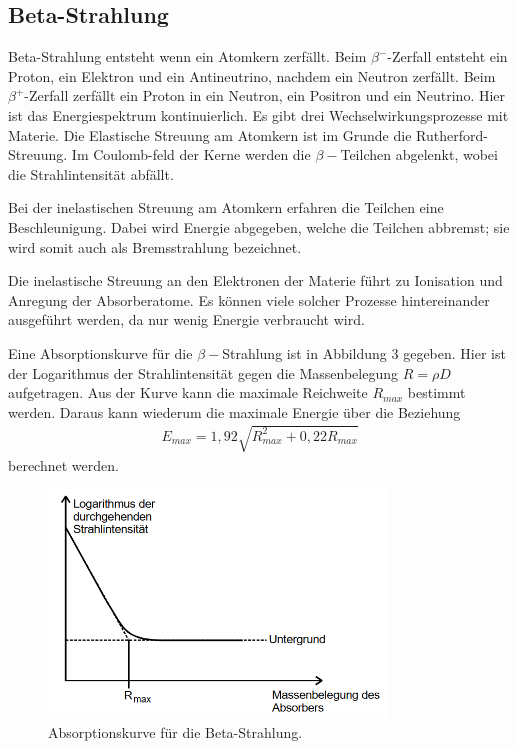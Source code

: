 \subsection{Beta-Strahlung}
Beta-Strahlung entsteht wenn ein Atomkern zerfällt. Beim $\beta^{-}$-Zerfall entsteht ein Proton, ein Elektron und ein Antineutrino, nachdem ein Neutron zerfällt.
Beim $\beta^{+}$-Zerfall zerfällt ein Proton in ein Neutron, ein Positron und ein Neutrino. 
Hier ist das Energiespektrum kontinuierlich.
Es gibt drei Wechselwirkungsprozesse mit Materie.
Die Elastische Streuung am Atomkern ist im Grunde die Rutherford-Streuung. Im Coulomb-feld der Kerne werden die $\beta-$Teilchen abgelenkt, wobei die Strahlintensität abfällt.

\noindent Bei der inelastischen Streuung am Atomkern erfahren die Teilchen eine Beschleunigung. Dabei wird Energie abgegeben, welche die Teilchen abbremst; sie wird somit auch als Bremsstrahlung bezeichnet.

\noindent Die inelastische Streuung an den Elektronen der Materie führt zu Ionisation und Anregung der Absorberatome. Es können viele solcher Prozesse hintereinander ausgeführt werden, da nur wenig Energie verbraucht wird. 

\noindent Eine Absorptionskurve für die $\beta-$Strahlung ist in Abbildung 3 gegeben. 
Hier ist der Logarithmus der Strahlintensität gegen die Massenbelegung $R = \rho D$ aufgetragen. Aus der Kurve kann die maximale Reichweite $R_{max}$ bestimmt werden.
Daraus kann wiederum die maximale Energie über die Beziehung
\begin{align}
  E_{max} = 1,92 \sqrt{R_{max}^2 + 0,22 R_{max}}
\end{align}
berechnet werden.
\begin{figure}[H]
  \centering
  \includegraphics[width=0.8\textwidth]{beta.png}
  \caption{Absorptionskurve für die Beta-Strahlung.\cite[S.12]{kent}}
  \label{fig:aufbau}
\end{figure}
